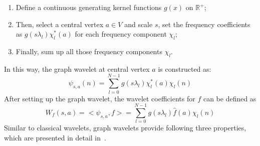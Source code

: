 \documentclass[conference]{IEEEtran}
\begin{document}
\begin{enumerate}
\item Define a continuous generating kernel functions $g(x)$ on $\mathbb{R}^+$;
\item Then, select a central vertex $a \in {V}$ and scale $s$, set the frequency coefficients as $g(s\lambda_l)\chi^*_l(a)$ for each frequency component $\chi_l$;
\item Finally, sum up all those frequency components $\chi_l$.
\end{enumerate}
In this way, the graph wavelet at central vertex $a$ is constructed as:
\begin{equation}
\label{eq:graphwaveletdefinition}
\psi_{s,a}(n) = \sum\limits_{l=0}^{N-1}g(s\lambda_l)\chi_l^*(a)\chi_l(n)
\end{equation}
After setting up the graph wavelet, the wavelet coefficients for $f$ can be defined as
\begin{equation}
\label{eq:graph_graphwavelet}
W_f(s,a)=<\psi_{s,a}, f>=\sum\limits_{l=0}^{N-1}g(s\lambda_l)\hat{f}(a)\chi_l(n)
\end{equation}
Similar to classical wavelets, graph wavelets provide following three properties, which are presented in detail in~\cite{hammond2011wavelets}.
\end{document}
